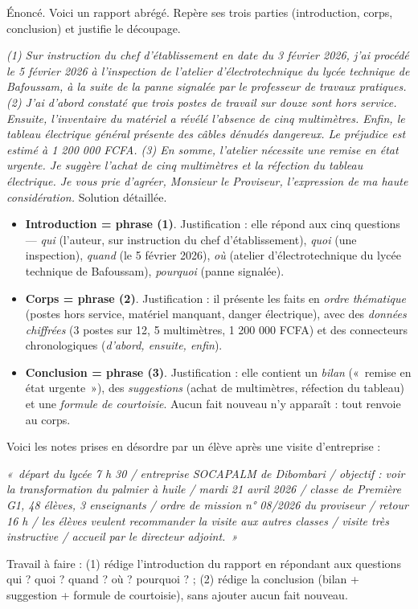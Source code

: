 \documentclass[11pt]{article}
\begin{document}
\begin{exoresolu}
Énoncé. Voici un rapport abrégé. Repère ses trois parties (introduction, corps, conclusion) et justifie le découpage.

\emph{(1) Sur instruction du chef d'établissement en date du 3 février 2026, j'ai procédé le 5 février 2026 à l'inspection de l'atelier d'électrotechnique du lycée technique de Bafoussam, à la suite de la panne signalée par le professeur de travaux pratiques. (2) J'ai d'abord constaté que trois postes de travail sur douze sont hors service. Ensuite, l'inventaire du matériel a révélé l'absence de cinq multimètres. Enfin, le tableau électrique général présente des câbles dénudés dangereux. Le préjudice est estimé à 1 200 000 FCFA. (3) En somme, l'atelier nécessite une remise en état urgente. Je suggère l'achat de cinq multimètres et la réfection du tableau électrique. Je vous prie d'agréer, Monsieur le Proviseur, l'expression de ma haute considération.}
\tcblower
Solution détaillée.
\begin{itemize}
\item \textbf{Introduction = phrase (1)}. Justification : elle répond aux cinq questions — \emph{qui} (l'auteur, sur instruction du chef d'établissement), \emph{quoi} (une inspection), \emph{quand} (le 5 février 2026), \emph{où} (atelier d'électrotechnique du lycée technique de Bafoussam), \emph{pourquoi} (panne signalée).
\item \textbf{Corps = phrase (2)}. Justification : il présente les faits en \emph{ordre thématique} (postes hors service, matériel manquant, danger électrique), avec des \emph{données chiffrées} (3 postes sur 12, 5 multimètres, 1 200 000 FCFA) et des connecteurs chronologiques (\emph{d'abord, ensuite, enfin}).
\item \textbf{Conclusion = phrase (3)}. Justification : elle contient un \emph{bilan} («~remise en état urgente~»), des \emph{suggestions} (achat de multimètres, réfection du tableau) et une \emph{formule de courtoisie}. Aucun fait nouveau n'y apparaît : tout renvoie au corps.
\end{itemize}
\end{exoresolu}

\begin{exercice}
Voici les notes prises en désordre par un élève après une visite d'entreprise :

\emph{«~départ du lycée 7 h 30 / entreprise SOCAPALM de Dibombari / objectif : voir la transformation du palmier à huile / mardi 21 avril 2026 / classe de Première G1, 48 élèves, 3 enseignants / ordre de mission n° 08/2026 du proviseur / retour 16 h / les élèves veulent recommander la visite aux autres classes / visite très instructive / accueil par le directeur adjoint.~»}

Travail à faire : (1) rédige l'introduction du rapport en répondant aux questions qui ? quoi ? quand ? où ? pourquoi ? ; (2) rédige la conclusion (bilan + suggestion + formule de courtoisie), sans ajouter aucun fait nouveau.
\end{exercice}
\end{document}
